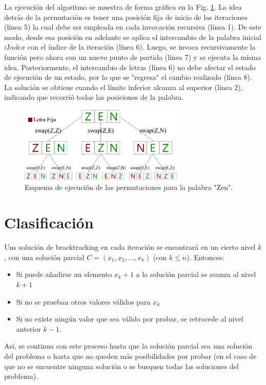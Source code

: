 La ejecución del algoritmo se muestra de forma gráfica en la Fig. \ref{fig:Ch2permutacion}. La idea detrás de la permutación es tener una posición fija de inicio de las iteraciones (línea 5) la cual debe ser empleada en cada invocación recursiva (línea 1). De este modo, desde esa posición en adelante se aplica el intercambio de la palabra inicial $iIndex$ con el índice de la iteración (línea 6). Luego, se invoca recursivamente la función pero ahora con un nuevo punto de partida (línea 7) y se ejecuta la misma idea. Posteriormente, el intercambio de letras (línea 6) no debe afectar el estado de ejecución de un estado, por lo que se "regresa" el cambio realizado (línea 8). La solución se obtiene cuando el límite inferior alcanza al superior (línea 2), indicando que recorrió todas las posiciones de la palabra.
\begin{figure}[htpb!]
  \begin{center}
    \includegraphics[width=0.7\textwidth]{images/backtracking.eps}
  \end{center}
  \caption{Esquema de ejecución de las permutaciones para la palabra "Zen".}
  \label{fig:Ch2permutacion}
\end{figure}

\section{Clasificación}

Uns solución de bracktracking en cada iteración se encontrará en un cierto nivel $k$, con una solución parcial $C = (x_1, x_2, ..., x_k)$ (con $k \le n$). Entonces:
\begin{itemize}
\item Si puede añadirse un elemento $x_k + 1$ a la solución parcial se avanza al nivel $k + 1$
\item Si no se prueban otros valores válidos para $x_k$
\item Si no existe ningún valor que sea válido por probar, se retrocede al nivel anterior $k - 1$.
\end{itemize}
Así, se continua con este proceso hasta que la solución parcial sea una solución del problema o hasta que no queden más posibilidades por probar (en el caso de que no se encuentre ninguna solución o se busquen todas las soluciones del problema).

